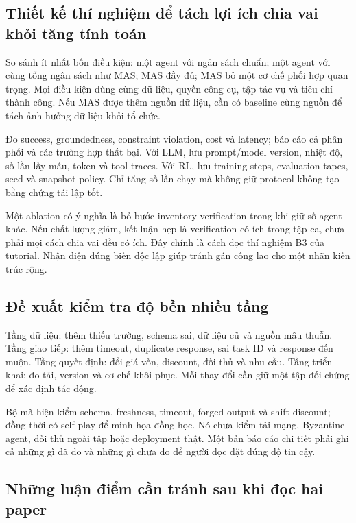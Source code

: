 \subsection{Thiết kế thí nghiệm để tách lợi ích chia vai khỏi tăng tính
toán}\label{thiux1ebft-kux1ebf-thuxed-nghiux1ec7m-ux111ux1ec3-tuxe1ch-lux1ee3i-uxedch-chia-vai-khux1ecfi-tux103ng-tuxednh-touxe1n}

So sánh ít nhất bốn điều kiện: một agent với ngân sách chuẩn; một agent
với cùng tổng ngân sách như MAS; MAS đầy đủ; MAS bỏ một cơ chế phối hợp
quan trọng. Mọi điều kiện dùng cùng dữ liệu, quyền công cụ, tập tác vụ
và tiêu chí thành công. Nếu MAS được thêm nguồn dữ liệu, cần có baseline
cùng nguồn để tách ảnh hưởng dữ liệu khỏi tổ chức.

Đo success, groundedness, constraint violation, cost và latency; báo cáo
cả phân phối và các trường hợp thất bại. Với LLM, lưu prompt/model
version, nhiệt độ, số lần lấy mẫu, token và tool traces. Với RL, lưu
training steps, evaluation tapes, seed và snapshot policy. Chỉ tăng số
lần chạy mà không giữ protocol không tạo bằng chứng tái lập tốt.

Một ablation có ý nghĩa là bỏ bước inventory verification trong khi giữ
số agent khác. Nếu chất lượng giảm, kết luận hẹp là verification có ích
trong tập ca, chưa phải mọi cách chia vai đều có ích. Đây chính là cách
đọc thí nghiệm B3 của tutorial. Nhận diện đúng biến độc lập giúp tránh
gán công lao cho một nhãn kiến trúc rộng.

\subsection{Đề xuất kiểm tra độ bền nhiều
tầng}\label{ux111ux1ec1-xuux1ea5t-kiux1ec3m-tra-ux111ux1ed9-bux1ec1n-nhiux1ec1u-tux1ea7ng}

Tầng dữ liệu: thêm thiếu trường, schema sai, dữ liệu cũ và nguồn mâu
thuẫn. Tầng giao tiếp: thêm timeout, duplicate response, sai task ID và
response đến muộn. Tầng quyết định: đổi giá vốn, discount, đối thủ và
nhu cầu. Tầng triển khai: đo tải, version và cơ chế khôi phục. Mỗi thay
đổi cần giữ một tập đối chứng để xác định tác động.

Bộ mã hiện kiểm schema, freshness, timeout, forged output và shift
discount; đồng thời có self-play để minh họa đồng học. Nó chưa kiểm tải
mạng, Byzantine agent, đối thủ ngoài tập hoặc deployment thật. Một bản
báo cáo chi tiết phải ghi cả những gì đã đo và những gì chưa đo để người
đọc đặt đúng độ tin cậy.

\subsection{Những luận điểm cần tránh sau khi đọc hai
paper}\label{nhux1eefng-luux1eadn-ux111iux1ec3m-cux1ea7n-truxe1nh-sau-khi-ux111ux1ecdc-hai-paper}

